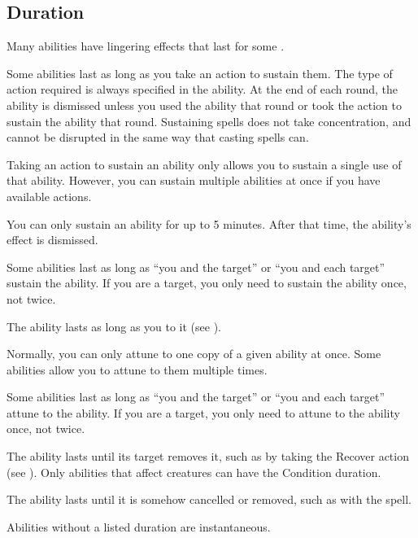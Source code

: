     \subsection{Duration}

        Many abilities have lingering effects that last for some .

        \label{Sustain} Some abilities last as long as you take an action to sustain them.
        The type of action required is always specified in the ability.
        At the end of each round, the ability is dismissed unless you used the ability that round or took the action to sustain the ability that round.
        Sustaining spells does not take concentration, and cannot be disrupted in the same way that casting spells can.

        Taking an action to sustain an ability only allows you to sustain a single use of that ability.
        However, you can sustain multiple abilities at once if you have available actions.

        You can only sustain an ability for up to 5 minutes.
        After that time, the ability's effect is dismissed.

         Some abilities last as long as ``you and the target'' or ``you and each target'' sustain the ability.
        If you are a target, you only need to sustain the ability once, not twice.

         The ability lasts as long as you  to it (see ).

         Normally, you can only attune to one copy of a given ability at once.
        Some abilities allow you to attune to them multiple times.

         Some abilities last as long as ``you and the target'' or ``you and each target'' attune to the ability.
        If you are a target, you only need to attune to the ability once, not twice.

         The ability lasts until its target removes it, such as by taking the Recover action (see ).
        Only abilities that affect creatures can have the Condition duration.

         The ability lasts until it is somehow cancelled or removed, such as with the  spell.

         Abilities without a listed duration are instantaneous.


